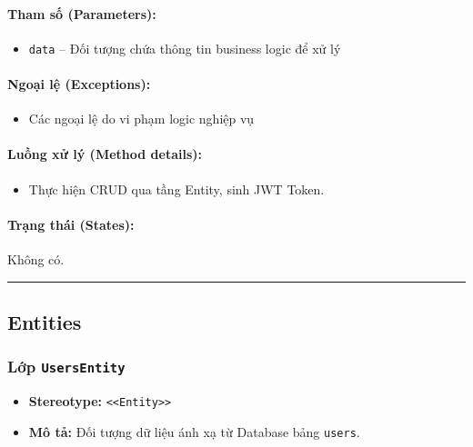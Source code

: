 \documentclass[12pt,a4paper]{article}
\begin{document}
\paragraph{Tham số (Parameters):}
\begin{itemize}[leftmargin=*]
    \item \texttt{data} – Đối tượng chứa thông tin business logic để xử lý
\end{itemize}


\paragraph{Ngoại lệ (Exceptions):}
\begin{itemize}[leftmargin=*]
    \item Các ngoại lệ do vi phạm logic nghiệp vụ
\end{itemize}


\paragraph{Luồng xử lý (Method details):}
\begin{itemize}[leftmargin=*]
    \item Thực hiện CRUD qua tầng Entity, sinh JWT Token.
\end{itemize}


\paragraph{Trạng thái (States):}
Không có.

\vskip 0.5cm
\noindent\rule{\textwidth}{0.5pt}
\vskip 0.5cm

\subsection{Entities}

\subsubsection{Lớp \texttt{UsersEntity}}
\begin{itemize}[leftmargin=*]
    \item \textbf{Stereotype:} \texttt{\textless{}\textless{}Entity\textgreater{}\textgreater{}}
    \item \textbf{Mô tả:} Đối tượng dữ liệu ánh xạ từ Database bảng \texttt{users}.
\end{itemize}
\end{document}

